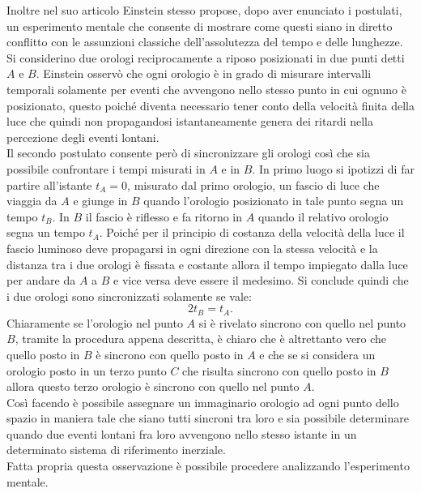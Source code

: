 Inoltre nel suo articolo Einstein stesso propose, dopo aver enunciato i postulati, un esperimento mentale che consente di mostrare come questi siano in diretto conflitto con le assunzioni classiche dell'assolutezza del tempo e delle lunghezze. Si considerino due orologi reciprocamente a riposo posizionati in due punti detti $A$ e $B$. Einstein osservò che ogni orologio è in grado di misurare intervalli temporali solamente per eventi che avvengono nello stesso punto in cui ognuno è posizionato, questo poiché diventa necessario tener conto della velocità finita della luce che quindi non propagandosi istantaneamente genera dei ritardi nella percezione degli eventi lontani.\\ Il secondo postulato consente però di sincronizzare gli orologi così che sia possibile confrontare i tempi misurati in $A$ e in $B$. In primo luogo si ipotizzi di far partire all'istante $t_A=0$, misurato dal primo orologio, un fascio di luce che viaggia da $A$ e giunge in $B$ quando l'orologio posizionato in tale punto segna un tempo $t_B$. In $B$ il fascio è riflesso e fa ritorno in $A$ quando il relativo orologio segna un tempo $t_A$. Poiché per il principio di costanza della velocità della luce il fascio luminoso deve propagarsi in ogni direzione con la stessa velocità e la distanza tra i due orologi è fissata e costante allora il tempo impiegato dalla luce per andare da $A$ a $B$ e vice versa deve essere il medesimo. Si conclude quindi che i due orologi sono sincronizzati solamente se vale:
\begin{equation}
    2t_B=t_A.
    \label{SinconizazioneOrologi}
\end{equation}
Chiaramente se l'orologio nel punto $A$ si è rivelato sincrono con quello nel punto $B$, tramite la procedura appena descritta, è chiaro che è altrettanto vero che quello posto in $B$ è sincrono con quello posto in $A$ e che se si considera un orologio posto in un terzo punto $C$ che risulta sincrono con quello posto in $B$ allora questo terzo orologio è sincrono con quello nel punto $A$.\\Così facendo è possibile assegnare un immaginario orologio ad ogni punto dello spazio in maniera tale che siano tutti sincroni tra loro e sia possibile determinare quando due eventi lontani fra loro avvengono nello stesso istante in un determinato sistema di riferimento inerziale.\\
Fatta propria questa osservazione è possibile procedere analizzando l'esperimento mentale.
